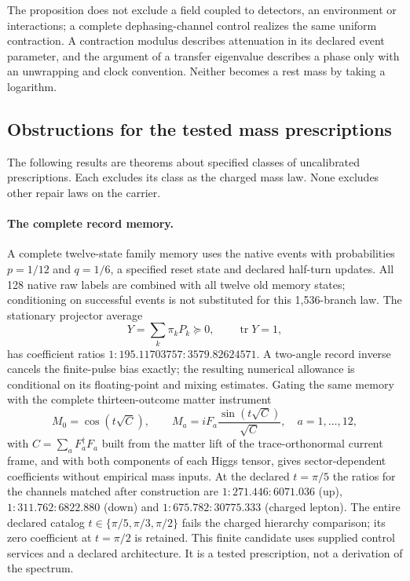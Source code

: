\documentclass[11pt]{article}
\begin{document}
The proposition does not exclude a field coupled to detectors, an
environment or interactions; a complete dephasing-channel control realizes
the same uniform contraction. A contraction modulus describes attenuation
in its declared event parameter, and the argument of a transfer eigenvalue
describes a phase only with an unwrapping and clock convention. Neither
becomes a rest mass by taking a logarithm.

\subsection{Obstructions for the tested mass prescriptions}
\label{sec:mass-obstructions}

The following results are theorems about specified classes of
uncalibrated prescriptions. Each excludes its class as the charged mass
law. None excludes other repair laws on the carrier.

\paragraph{The complete record memory.}
A complete twelve-state family memory uses the native events with
probabilities \(p=1/12\) and \(q=1/6\), a specified reset state and declared
half-turn updates. All 128 native raw labels are combined with all twelve old
memory states; conditioning on successful events is not substituted for
this 1,536-branch law. The stationary projector average
\[
 Y=\sum_k\pi_kP_k\succeq0,\qquad\operatorname{tr}Y=1,
\]
has coefficient ratios \(1:195.11703757:3579.82624571\). A two-angle record
inverse cancels the finite-pulse bias exactly; the resulting numerical
allowance is conditional on its floating-point and mixing estimates. Gating
the same memory with the complete thirteen-outcome matter instrument
\[
 M_0=\cos(t\sqrt C),\qquad
 M_a=iF_a\frac{\sin(t\sqrt C)}{\sqrt C},\quad a=1,\ldots,12,
\]
with \(C=\sum_aF_a^\dagger F_a\) built from the matter lift of the
trace-orthonormal current frame, and with both components of each Higgs
tensor, gives sector-dependent coefficients without empirical mass inputs.
At the declared \(t=\pi/5\) the ratios for the channels matched after
construction are \(1:271.446:6071.036\) (up), \(1:311.762:6822.880\) (down)
and \(1:675.782:30775.333\) (charged lepton). The entire declared catalog
\(t\in\{\pi/5,\pi/3,\pi/2\}\) fails the charged hierarchy comparison; its
zero coefficient at \(t=\pi/2\) is retained. This finite candidate uses
supplied control services and a declared architecture. It is a tested
prescription, not a derivation of the spectrum.
\end{document}
